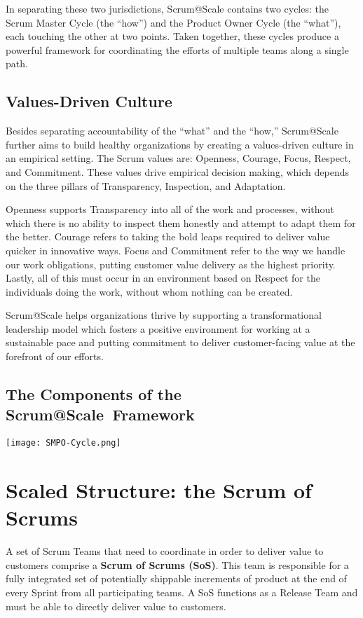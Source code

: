 \documentclass[12pt,a4paper,parskip=full]{scrartcl}
\begin{document}
In separating these two jurisdictions, Scrum@Scale contains two cycles: the Scrum Master Cycle (the ``how'') and the Product Owner Cycle (the ``what''), each touching the other at two points. Taken together, these cycles produce a powerful framework for coordinating the efforts of multiple teams along a single path.

\subsection{Values-Driven Culture}

Besides separating accountability of the ``what'' and the ``how,'' Scrum@Scale further aims to build healthy organizations by creating a values-driven culture in an empirical setting. The Scrum values are: Openness, Courage, Focus, Respect, and Commitment. These values drive empirical decision making, which depends on the three pillars of Transparency, Inspection, and Adaptation.

Openness supports Transparency into all of the work and processes, without which there is no ability to inspect them honestly and attempt to adapt them for the better. Courage refers to taking the bold leaps required to deliver value quicker in innovative ways.
Focus and Commitment refer to the way we handle our work obligations, putting customer value delivery as the highest priority. Lastly, all of this must occur in an environment based on Respect for the individuals doing the work, without whom nothing can be created.

Scrum@Scale helps organizations thrive by supporting a transformational leadership model which fosters a positive environment for working at a sustainable pace and putting commitment to deliver customer-facing value at the forefront of our efforts.

\subsection{The Components of the Scrum@Scale\textregistered ~Framework}

\texttt{[image: SMPO-Cycle.png]}

\section{Scaled Structure: the Scrum of Scrums}

A set of Scrum Teams that need to coordinate in order to deliver value to customers comprise a \textbf{Scrum of Scrums (SoS)}. This team is responsible for a fully integrated set of potentially shippable increments of product at the end of every Sprint from all participating teams. A SoS functions as a Release Team and must be able to directly deliver value to customers.
\end{document}
